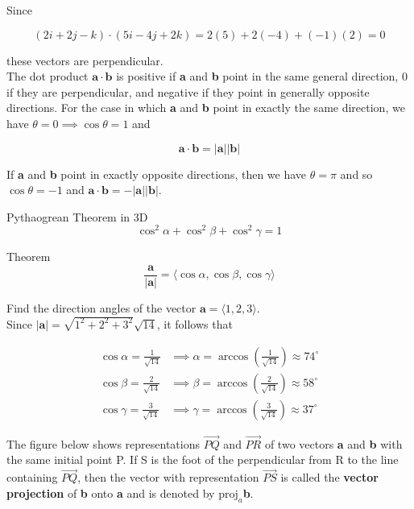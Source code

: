         \textit{} Since

        \[
            (2i + 2j - k) \cdot (5i - 4j + 2k) = 2(5) + 2(-4) + (-1)(2) = 0
        \]

        these vectors are perpendicular. \\

        The dot product $\mathbf{a\cdot b}$ is positive if \textbf{a} and \textbf{b} point in the same general direction, 0 if they are perpendicular, and negative if they point in generally opposite directions. For
        the case in which \textbf{a} and \textbf{b} point in exactly the same direction, we have $\theta = 0\implies \cos{\theta} = 1$ and

        \[
            \mathbf{a \cdot b = |a||b|}
        \]

        If \textbf{a} and \textbf{b} point in exactly opposite directions, then we have $\theta = \pi$ and so $\cos{\theta} = -1$ and $\mathbf{a\cdot b = -|a||b|}$.

        \begin{theorem}{Pythaogrean Theorem in 3D}
            \[
                \cos^2{\alpha} + \cos^2{\beta} + \cos^2{\gamma} = 1
            \]
        \end{theorem}

        \begin{theorem}{Theorem}
            \[
                \frac{\mathbf{a}}{|\mathbf{a}|} = \langle \cos{\alpha}, \cos{\beta}, \cos{\gamma}\rangle
            \]
        \end{theorem}

        \textit{} Find the direction angles of the vector $\mathbf{a} = \langle 1,2,3\rangle$. \\
        Since $|\mathbf{a}| = \sqrt{1^2 + 2^2 + 3^2} \sqrt{14}$, it follows that

        \begin{align*}
            \cos{\alpha} = \frac{1}{\sqrt{14}}      & \implies \alpha = \arccos{\left(\frac{1}{\sqrt{14}}\right)}\approx 74^{\circ} \\
            \cos{\beta} = \frac{2}{\sqrt{14}}       & \implies \beta = \arccos{\left(\frac{2}{\sqrt{14}}\right)}\approx 58^{\circ} \\
            \cos{\gamma} = \frac{3}{\sqrt{14}}      & \implies \gamma = \arccos{\left(\frac{3}{\sqrt{14}}\right)}\approx 37^{\circ}
        \end{align*}

        The figure below shows representations $\vec{PQ}$ and $\vec{PR}$ of two vectors \textbf{a} and \textbf{b} with the same initial point P. If S is the foot of the perpendicular from R to the line containing
        $\vec{PQ}$, then the vector with representation $\vec{PS}$ is called the \textbf{vector projection} of \textbf{b} onto \textbf{a} and is denoted by $\text{proj}_a$\textbf{b}.

